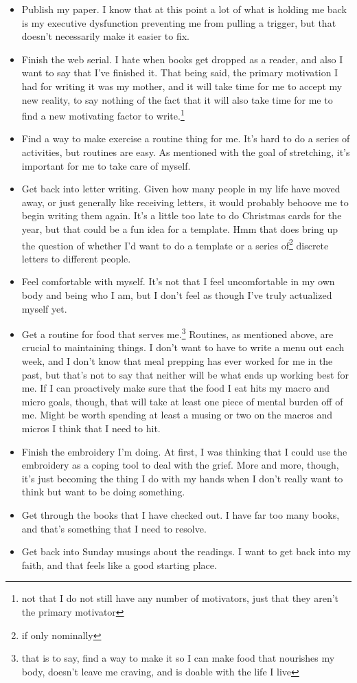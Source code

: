 \documentclass[12pt]{article}[titlepage]
\renewcommand{\,}{\textsuperscript{,}}
\begin{document}
\begin{itemize}
\item Publish my paper. I know that at this point a lot of what is holding me back is my executive dysfunction preventing me from pulling a trigger, but that doesn't necessarily make it easier to fix.  
\item Finish the web serial. I hate when books get dropped as a reader, and also I want to say that I've finished it. That being said, the primary motivation I had for writing it was my mother, and it will take time for me to accept my new reality, to say nothing of the fact that it will also take time for me to find a new motivating factor to write.\footnote{not that I do not still have any number of motivators, just that they aren't the primary motivator}  
\item Find a way to make exercise a routine thing for me. It's hard to do a series of activities, but routines are easy. As mentioned with the goal of stretching, it's important for me to take care of myself.  
\item Get back into letter writing. Given how many people in my life have moved away, or just generally like receiving letters, it would probably behoove me to begin writing them again. It's a little too late to do Christmas cards for the year, but that could be a fun idea for a template. Hmm that does bring up the question of whether I'd want to do a template or a series of\footnote{if only nominally} discrete letters to different people.  
\item Feel comfortable with myself. It's not that I feel uncomfortable in my own body and being who I am, but I don't feel as though I've truly actualized myself yet.  
\item Get a routine for food that serves me.\footnote{that is to say, find a way to make it so I can make food that nourishes my body, doesn't leave me craving, and is doable with the life I live} Routines, as mentioned above, are crucial to maintaining things. I don't want to have to write a menu out each week, and I don't know that meal prepping has ever worked for me in the past, but that's not to say that neither will be what ends up working best for me. If I can proactively make sure that the food I eat hits my macro and micro goals, though, that will take at least one piece of mental burden off of me. Might be worth spending at least a musing or two on the macros and micros I think that I need to hit.  
\item Finish the embroidery I'm doing. At first, I was thinking that I could use the embroidery as a coping tool to deal with the grief. More and more, though, it's just becoming the thing I do with my hands when I don't really want to think but want to be doing something.  
\item Get through the books that I have checked out. I have far too many books, and that's something that I need to resolve.  
\item Get back into Sunday musings about the readings. I want to get back into my faith, and that feels like a good starting place.  
\end{itemize}
\end{document}
